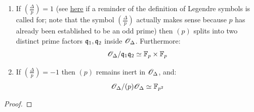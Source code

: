 \begin{corollary}
\begin{enumerate}
                                \begin{enumerate}
                                    \item If $\left(\frac{\Delta}{p}\right) = 1$ (see \href{https://ncatlab.org/nlab/show/quadratic+reciprocity+law}{\underline{here}} if a reminder of the definition of Legendre symbols is called for; note that the symbol $\left(\frac{\Delta}{p}\right)$ actually makes sense because $p$ has already been established to be an odd prime) then $(p)$ splits into two distinct prime factors $\mathfrak{q}_1, \mathfrak{q}_2$ inside $\mathscr{O}_{\Delta}$. Furthermore:
                                        $$\scrO_{\Delta}/\q_1\q_2 \cong \F_p \x \F_p$$
                                    \item If $\left(\frac{\Delta}{p}\right) = -1$ then $(p)$ remains inert in $\mathscr{O}_{\Delta}$, and:
                                        $$\mathscr{O}_{\Delta}/(p)\mathscr{O}_{\Delta} \simeq \mathbb{F}_{p^2}$$
                                \end{enumerate}
                        \end{enumerate}
                \end{corollary}
                    \begin{proof}
                        
                    \end{proof}
                    
